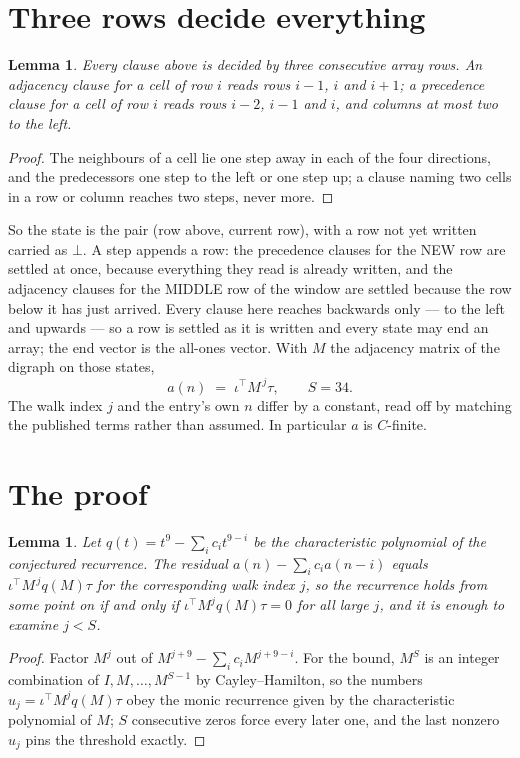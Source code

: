 \documentclass[11pt,a4paper]{article}
\theoremstyle{plain}
\newtheorem{lemma}[theorem]{Lemma}
\theoremstyle{definition}
\begin{document}
\section{Three rows decide everything}

\begin{lemma}\label{lem:win}
Every clause above is decided by three consecutive array rows. An adjacency clause for a cell
of row $i$ reads rows $i-1$, $i$ and $i+1$; a precedence clause for a cell of row $i$ reads
rows $i-2$, $i-1$ and $i$, and columns at most two to the left.
\end{lemma}

\begin{proof}
The neighbours of a cell lie one step away in each of the four directions, and the predecessors
one step to the left or one step up; a clause naming two cells in a row or column reaches two
steps, never more.
\end{proof}

So the state is the pair (row above, current row), with a row not yet written carried as
$\bot$. A step appends a row: the precedence clauses for the NEW row are settled at once,
because everything they read is already written, and the adjacency clauses for the MIDDLE row
of the window are settled because the row below it has just arrived. Every clause here reaches backwards only --- to the left and upwards --- so a
row is settled as it is written and every state may end an array; the end vector is the
all-ones vector. With $M$ the
adjacency matrix of the digraph on those states,
\[
a(n)\;=\;\iota^{\!\top}M^{\,j}\tau ,\qquad S=34.
\]
The walk index $j$ and the entry's own $n$ differ by a constant, read off by matching the
published terms rather than assumed. In particular $a$ is $C$-finite.

\section{The proof}

\begin{lemma}\label{lem:crit}
Let $q(t)=t^{9}-\sum_i c_it^{9-i}$ be the characteristic polynomial of the
conjectured recurrence. The residual $a(n)-\sum_ic_ia(n-i)$ equals
$\iota^{\!\top}M^{\,j}q(M)\tau$ for the corresponding walk index $j$, so the recurrence
holds from some point on if and only if $\iota^{\!\top}M^{j}q(M)\tau=0$ for all large $j$,
and it is enough to examine $j<S$.
\end{lemma}

\begin{proof}
Factor $M^{j}$ out of $M^{j+9}-\sum_ic_iM^{j+9-i}$. For the bound, $M^{S}$
is an integer combination of $I,M,\dots,M^{S-1}$ by Cayley--Hamilton, so the numbers
$u_j=\iota^{\!\top}M^{j}q(M)\tau$ obey the monic recurrence given by the characteristic
polynomial of $M$; $S$ consecutive zeros force every later one, and the last nonzero $u_j$
pins the threshold exactly.
\end{proof}
\end{document}
